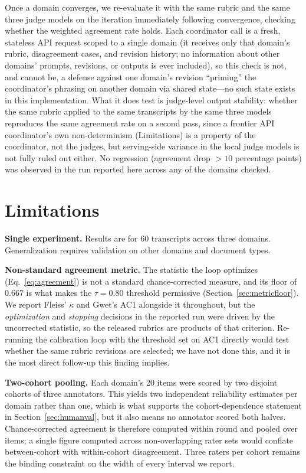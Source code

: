 \documentclass[11pt]{article}
\begin{document}
Once a domain converges, we re-evaluate it with the same rubric and the
same three judge models on the iteration immediately following convergence,
checking whether the weighted agreement rate holds. Each coordinator call
is a fresh, stateless API request scoped to a single domain (it receives
only that domain's rubric, disagreement cases, and revision history; no
information about other domains' prompts, revisions, or outputs is ever
included), so this check is not, and cannot be, a defense against one
domain's revision ``priming'' the coordinator's phrasing on another domain
via shared state---no such state exists in this implementation. What it
does test is judge-level output stability: whether the same rubric applied
to the same transcripts by the same three models reproduces the same
agreement rate on a second pass, since a frontier API coordinator's own
non-determinism (Limitations) is a property of the coordinator, not the
judges, but serving-side variance in the local judge models is not fully
ruled out either. No regression (agreement drop $>10$ percentage points)
was observed in the run reported here across any of the domains checked.

\section{Limitations}

\textbf{Single experiment.} Results are for 60 transcripts across three
domains. Generalization requires validation on other domains and document types.

\textbf{Non-standard agreement metric.} The statistic the loop optimizes
(Eq.~\ref{eq:agreement}) is not a standard chance-corrected measure, and
its floor of $0.667$ is what makes the $\tau = 0.80$ threshold permissive
(Section~\ref{sec:metricfloor}). We report Fleiss' $\kappa$ and Gwet's AC1
alongside it throughout, but the \emph{optimization} and \emph{stopping}
decisions in the reported run were driven by the uncorrected statistic, so
the released rubrics are products of that criterion. Re-running the
calibration loop with the threshold set on AC1 directly would test whether
the same rubric revisions are selected; we have not done this, and it is
the most direct follow-up this finding implies.

\textbf{Two-cohort pooling.} Each domain's 20 items were scored by two
disjoint cohorts of three annotators. This yields two independent
reliability estimates per domain rather than one, which is what supports
the cohort-dependence statement in Section~\ref{sec:humanval}, but it also
means no annotator scored both halves. Chance-corrected agreement is
therefore computed within round and pooled over items; a single figure
computed across non-overlapping rater sets would conflate between-cohort
with within-cohort disagreement. Three raters per cohort remains the
binding constraint on the width of every interval we report.
\end{document}
